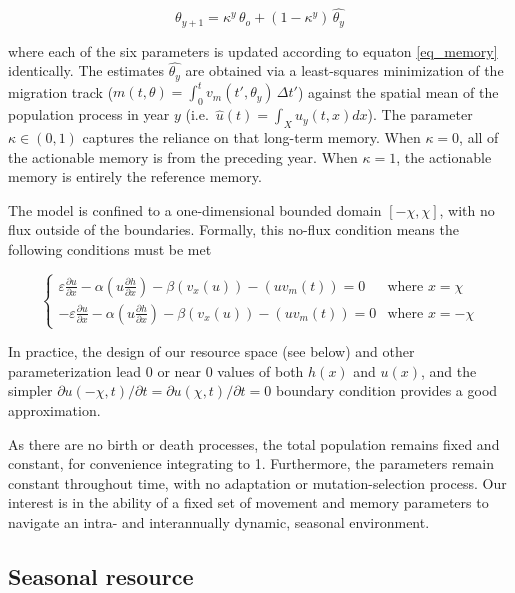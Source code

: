 \documentclass[utf8]{frontiersSCNS} %
\begin{document}
	\begin{equation}\label{eq_memory}
	\theta_{y+1} = \kappa^y \, \theta_o + \left(1-\kappa^y\right)\,\widehat{\theta_y} 
\end{equation}
	
	\noindent where each of the six parameters is updated according to equaton \ref{eq_memory} identically. The estimates $\widehat{\theta_y}$ are obtained via a least-squares minimization of the migration track ($m(t,\theta) = \int_0^t v_m(t',\theta_y) \, \Delta t'$) against the spatial mean of the population process in year $y$ (i.e.~$\widehat{u}(t) = \int_X u_y(t, x) dx$). The parameter $\kappa \in (0,1)$ captures the reliance on that long-term memory. When $\kappa = 0$, all of the actionable memory is from the preceding year. When $\kappa = 1$, the actionable memory is entirely the reference memory.
	
	The model is confined to a one-dimensional bounded domain $[-\chi,\chi]$, with no flux outside of the boundaries. Formally, this no-flux condition means the following conditions must be met 
	
	$$
	\begin{cases}
		\varepsilon \frac{\partial u}{\partial x} - 		
	\alpha \left(u \frac{\partial h}{\partial x}\right) - \beta(v_x(u)) - (uv_m(t)) = 0 & \text{where}\,\, x = \chi\\
	-\varepsilon \frac{\partial u}{\partial x} - 
	\alpha \left(u \frac{\partial h}{\partial x}\right) - \beta(v_x(u)) - (uv_m(t)) = 0 & \text{where}\,\, x = -\chi
	\end{cases}
$$


	\noindent In practice, the design of our resource space (see below) and other parameterization lead 0 or near 0 values of both $h(x)$ and $u(x)$, and the simpler ${\partial u(-\chi,t)}/{\partial t} = {\partial u(\chi,t)}/{\partial t} =0$ boundary condition provides a good approximation. 
	
	As there are no birth or death processes, the total population remains fixed and constant, for convenience integrating to 1. Furthermore, the parameters remain constant throughout time, with no adaptation or mutation-selection process. Our interest is in the ability of a fixed set of movement and memory parameters to navigate an intra- and interannually dynamic, seasonal environment.
	
\subsection{Seasonal resource}
	
\end{document}
